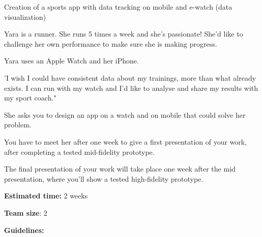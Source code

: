 \makeheaderfiles

Creation of a sports app with data tracking on mobile and e-watch (data visualization)

Yara is a runner. She runs 5 times a week and she's passionate! She'd like to challenge her own performance to make sure she is making progress.

Yara uses an Apple Watch and her iPhone.

'I wish I could have consistent data about my trainings, more than what already exists. I can run with my watch and I'd like to analyse and share my results with my sport coach."

She asks you to design an app on a watch and on mobile that could solve her problem.

You have to meet her after one week to give a first presentation of your work, after completing a tested mid-fidelity prototype.

The final presentation of your work will take place one week after the mid presentation, where you'll show a tested high-fidelity prototype.

\textbf{Estimated time:} 2 weeks

\textbf{Team size}: 2

\textbf{Guidelines:}

